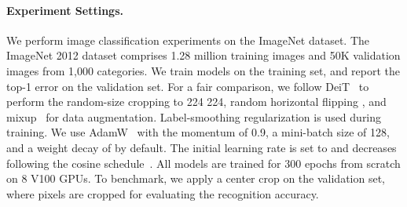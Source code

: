 \documentclass[10pt,twocolumn,letterpaper]{article}
\begin{document}
\paragraph{Experiment Settings.}
We perform image classification experiments on the ImageNet dataset. 
The ImageNet 2012 dataset \cite{russakovsky2015imagenet} comprises 1.28 million training images and 50K validation images from 1,000 categories. 
We train models on the training set, and report the top-1 error on the validation set.
For a fair comparison, we follow DeiT~\cite{touvron2020training} to perform the random-size cropping to 224 224, random horizontal flipping \cite{szegedy2015going}, and mixup~\cite{zhang2017mixup} for data augmentation. Label-smoothing regularization \cite{szegedy2016rethinking} is used during training. We use  AdamW~\cite{loshchilov2017decoupled} with the momentum of 0.9, a mini-batch size of 128, and a weight decay of  by default. The initial learning rate is set to  and decreases following the cosine schedule~\cite{loshchilov2016sgdr}.  All models are trained for 300 epochs from scratch on 8 V100 GPUs.
To benchmark, we apply a center crop on the validation set, where  pixels are cropped for evaluating the recognition accuracy. 
\end{document}
